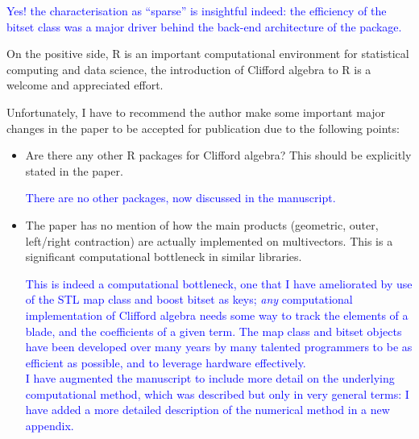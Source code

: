 \documentclass{article}
\begin{document}
\textcolor{blue}{Yes! the characterisation as ``sparse'' is insightful
  indeed: the efficiency of the bitset class was a major driver behind
  the back-end architecture of the package.}

On the positive side, R is an important computational environment for
statistical computing and data science, the introduction of Clifford
algebra to R is a welcome and appreciated effort.

Unfortunately, I have to recommend the author make some important
major changes in the paper to be accepted for publication due to the
following points:

\begin{itemize}
  \item Are there any other R packages for Clifford algebra? This
    should be explicitly stated in the paper.

    \textcolor{blue}{There are no other packages, now discussed in the
      manuscript.}
  \item The paper has no mention of how the main products (geometric,
    outer, left/right contraction) are actually implemented on
    multivectors. This is a significant computational bottleneck in
    similar libraries.

    \textcolor{blue}{This is indeed a computational bottleneck, one
      that I have ameliorated by use of the STL map class and boost
      bitset as keys; {\em any} computational implementation of
      Clifford algebra needs some way to track the elements of a
      blade, and the coefficients of a given term.  The map class and
      bitset objects have been developed over many years by many
      talented programmers to be as efficient as possible, and to
      leverage hardware effectively.\\ I have augmented the manuscript
      to include more detail on the underlying computational method,
      which was described but only in very general terms: I have added
      a more detailed description of the numerical method in a new
      appendix.}


\end{itemize}
\end{document}

